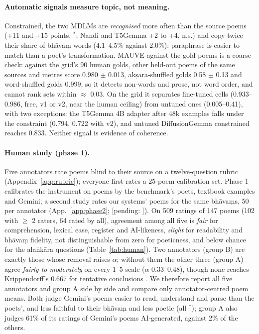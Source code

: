 \documentclass[11pt]{article}
\newcommand{\pend}[1]{\textcolor{pend}{\textsf{\footnotesize[pending: #1]}}}
\newcommand{\sig}{$^{\ast}$}
\begin{document}
\paragraph{Automatic signals measure topic, not meaning.} Constrained, the two MDLMs are \emph{recognised} more
often than the source poems (+11 and +15 points, \sig; Nandi and T5Gemma +2 to +4, n.s.) and copy twice their
share of bhāvaṃ words (4.1--4.5\% against 2.0\%): paraphrase is easier to match than a poet's transformation.
MAUVE against the gold poems is a coarse check: against
the grid's 90 human golds, other held-out poems of the same sources and metres score 0.980 $\pm$ 0.013,
akṣara-shuffled golds 0.58 $\pm$ 0.13 and word-shuffled golds 0.999, so it detects non-words and prose, not
word order, and cannot rank sets within $\approx$ 0.03. On the grid it separates fine-tuned cells (0.933--0.986,
free, v1 or v2, near the human ceiling) from untuned ones (0.005--0.41), with two exceptions: the T5Gemma 4B
adapter after 48k examples falls under the constraint (0.794, 0.722 with v2), and untuned DiffusionGemma
constrained reaches 0.833. Neither signal is evidence of coherence.

\paragraph{Human study (phase 1).} Five annotators rate poems blind to their source on a twelve-question rubric
(Appendix~\ref{app:rubric}); everyone first rates a 25-poem calibration set. Phase 1 calibrates the instrument on
poems by the benchmark's poets, textbook examples and Gemini; a second study rates our systems' poems for the same
bhāvaṃs, 50 per annotator (App.~\ref{app:phase2}; \pend{}). On 509 ratings of 147 poems (102 with $\geq$ 2
raters, 64 rated by all), agreement among all five is \emph{fair} \citep{landis1977kappa} for comprehension,
lexical ease, register and AI-likeness, \emph{slight} for readability and bhāvaṃ fidelity, not distinguishable
from zero for poeticness, and below chance for the alaṅkāra questions (Table~\ref{tab:human}). Two annotators (group B) are
exactly those whose removal raises $\alpha$; without them the other three (group A) agree \emph{fairly to
moderately} on every 1--5 scale ($\alpha$ 0.33--0.48), though none reaches Krippendorff's 0.667 for tentative
conclusions \citep{krippendorff2018content}. We therefore report all five annotators and group A side by side
and compare only annotator-centred poem means. Both judge Gemini's poems easier to read, understand and parse
than the poets', and less faithful to their bhāvaṃ and less poetic (all \sig); group A also judges 61\% of its
ratings of Gemini's poems AI-generated, against 2\% of the others.
\end{document}
